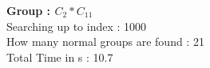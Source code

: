 \textbf{Group : $C_2*C_{11}$}\\
Searching up to index : 1000\\
How many normal groups are found : 21\\
Total Time in s : 10.7\\
